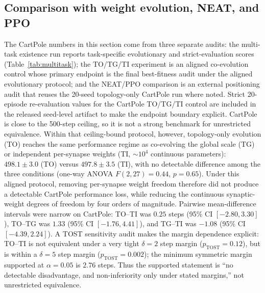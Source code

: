 \documentclass[10pt]{article}
\begin{document}
\subsection{Comparison with weight evolution, NEAT, and PPO}
\label{sec:exp-weight}

The CartPole numbers in this section come from three separate audits: the
multi-task existence run reports task-specific evolutionary and strict-evaluation
scores (Table~\ref{tab:multitask}); the TO/TG/TI experiment is an aligned
co-evolution control whose primary endpoint is the final best-fitness audit
under the aligned evolutionary protocol; and the NEAT/PPO comparison is an
external positioning audit that reuses the 20-seed topology-only CartPole run
where noted. Strict 20-episode re-evaluation values for the CartPole TO/TG/TI
control are included in the released seed-level artifact to make the endpoint
boundary explicit. CartPole is close to the 500-step ceiling, so it is not a
strong benchmark for unrestricted equivalence. Within that ceiling-bound
protocol, however, topology-only evolution (TO) reaches the same performance
regime as co-evolving the global scale (TG) or independent per-synapse weights
(TI, ${\sim}10^4$ continuous parameters): $498.1\pm3.0$ (TO) versus
$497.8\pm3.5$ (TI), with no detectable difference among the three conditions
(one-way ANOVA $F(2,27)=0.44$, $p=0.65$). Under this aligned protocol, removing
per-synapse weight freedom therefore did not produce a detectable CartPole
performance loss, while reducing the continuous synaptic-weight degrees of
freedom by four orders of magnitude. Pairwise mean-difference intervals were
narrow on CartPole: TO--TI was $0.25$ steps (95\% CI $[-2.80,3.30]$), TO--TG
was $1.33$ (95\% CI $[-1.76,4.41]$), and TG--TI was $-1.08$ (95\% CI
$[-4.39,2.24]$). A TOST sensitivity audit makes the margin dependence explicit:
TO--TI is not equivalent under a very tight $\delta=2$ step margin
($p_\mathrm{TOST}=0.12$), but is within a $\delta=5$ step margin
($p_\mathrm{TOST}=0.002$); the minimum symmetric margin supported at
$\alpha=0.05$ is $2.76$ steps. Thus the supported statement is
``no detectable disadvantage, and non-inferiority only under stated margins,''
not unrestricted equivalence.
\end{document}
